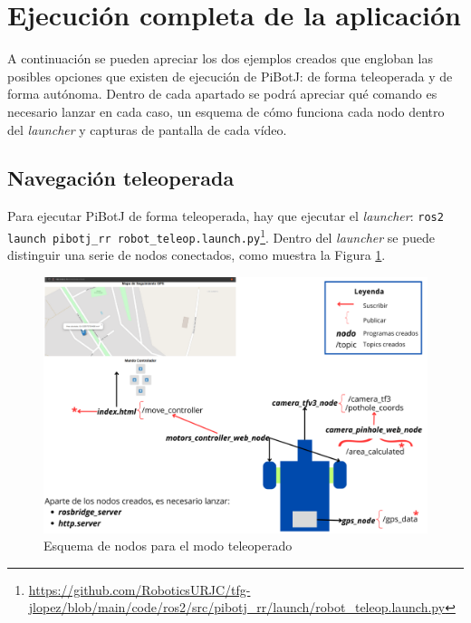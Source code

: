 \section{Ejecución completa de la aplicación}
\label{sec:expcompleto}
A continuación se pueden apreciar los dos ejemplos creados que engloban las posibles opciones que existen de ejecución de PiBotJ: de forma teleoperada y de forma autónoma. Dentro de cada apartado se podrá apreciar qué comando es necesario lanzar en cada caso, un esquema de cómo funciona cada nodo dentro del \textit{launcher} y capturas de pantalla de cada vídeo.

\subsection{Navegación teleoperada}

Para ejecutar PiBotJ de forma teleoperada, hay que ejecutar el \textit{launcher}: \verb|ros2 launch pibotj_rr robot_teleop.launch.py|\footnote{\url{https://github.com/RoboticsURJC/tfg-jlopez/blob/main/code/ros2/src/pibotj_rr/launch/robot_teleop.launch.py}}. Dentro del \textit{launcher} se puede distinguir una serie de nodos conectados, como muestra la Figura \ref{fig:nodosteleop}. 

\begin{figure} [h!]
	\begin{center}
			\includegraphics[width=15cm]{figs/cap7/esquema_nodos_teleop_ampliado.png}
		\end{center}
	\caption{Esquema de nodos para el modo teleoperado}
	\label{fig:nodosteleop}
\end{figure}
 
